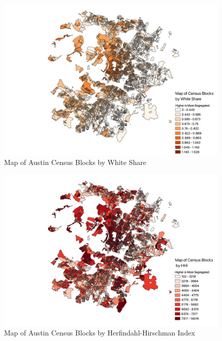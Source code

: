 \documentclass[11pt]{article}
\begin{document}
\begin{figure}[H]
    \centering
    \includegraphics[width=\textwidth]{white-share_map_monochrome.png}
    \caption{Map of Austin Census Blocks by White Share}
    \label{fig:white-share_map_blocks}
\end{figure}

\begin{figure}[H]
    \centering
    \includegraphics[width=\textwidth]{HHI_map_monochrome.pdf}
    \caption{Map of Austin Census Blocks by Herfindahl-Hirschman Index}
    \label{fig:HHI_map_blocks}
\end{figure}
\end{document}
